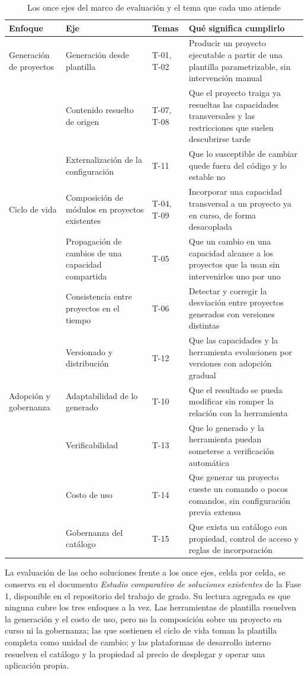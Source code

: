 \begin{table}[H]
\centering
{\footnotesize
\begin{tabular}{p{3.2cm}p{5.3cm}p{1.2cm}p{4.6cm}}
\toprule
\textbf{Enfoque} & \textbf{Eje} & \textbf{Temas} & \textbf{Qué significa cumplirlo} \\
\midrule
Generación de proyectos & Generación desde plantilla & T-01, T-02 & Producir un proyecto ejecutable a partir de una plantilla parametrizable, sin intervención manual \\
 & Contenido resuelto de origen & T-07, T-08 & Que el proyecto traiga ya resueltas las capacidades transversales y las restricciones que suelen descubrirse tarde \\
 & Externalización de la configuración & T-11 & Que lo susceptible de cambiar quede fuera del código y lo estable no \\
\midrule
Ciclo de vida & Composición de módulos en proyectos existentes & T-04, T-09 & Incorporar una capacidad transversal a un proyecto ya en curso, de forma desacoplada \\
 & Propagación de cambios de una capacidad compartida & T-05 & Que un cambio en una capacidad alcance a los proyectos que la usan sin intervenirlos uno por uno \\
 & Consistencia entre proyectos en el tiempo & T-06 & Detectar y corregir la desviación entre proyectos generados con versiones distintas \\
 & Versionado y distribución & T-12 & Que las capacidades y la herramienta evolucionen por versiones con adopción gradual \\
\midrule
Adopción y gobernanza & Adaptabilidad de lo generado & T-10 & Que el resultado se pueda modificar sin romper la relación con la herramienta \\
 & Verificabilidad & T-13 & Que lo generado y la herramienta puedan someterse a verificación automática \\
 & Costo de uso & T-14 & Que generar un proyecto cueste un comando o pocos comandos, sin configuración previa extensa \\
 & Gobernanza del catálogo & T-15 & Que exista un catálogo con propiedad, control de acceso y reglas de incorporación \\
\bottomrule
\end{tabular}
}
\caption{Los once ejes del marco de evaluación y el tema que cada uno atiende}
\label{tab:ejes}
\end{table}

La evaluación de las ocho soluciones frente a los once ejes, celda por celda,
se conserva en el documento \emph{Estudio comparativo de soluciones
existentes} de la Fase 1, disponible en el repositorio del trabajo de grado.
Su lectura agregada es que ninguna cubre los tres enfoques a la vez. Las
herramientas de plantilla resuelven la generación y el costo de uso, pero no
la composición sobre un proyecto en curso ni la gobernanza; las que sostienen
el ciclo de vida toman la plantilla completa como unidad de cambio; y las
plataformas de desarrollo interno resuelven el catálogo y la propiedad al
precio de desplegar y operar una aplicación propia.

